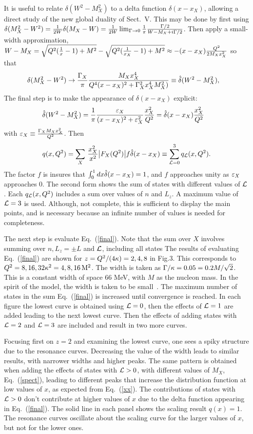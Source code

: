 \documentclass[aps,prd,amsmath,longbibliography]{revtex4-1}
\def\xX{x_X}
\newcommand{\eq}[1]{Eq.~(\ref{#1})}
\def\bea{\begin{eqnarray}}
\def\eea{\end{eqnarray}}\def\a{\alpha}\newcommand{\bfk}{{\bf k}}\newcommand{\bfq}{{\bf q}}
\begin{document}
{ It is useful to relate $\delta(W^2-M_X^2)$  to a delta function  $\delta(x-x_X)$, allowing a direct study of the new global duality of
 Sect.~V.  This may be done by first  using $ \delta(M_X^2 -W^2)= {1\over 2W}\delta(M_X-W)={1\over 2W} \lim_{\Gamma\to0}{1\over \pi}{\Gamma/2\over W-M_X+i\Gamma/2}$. Then apply a  small-width approximation, $W-M_X =\sqrt{Q^2({1\over x}-1)+M^2}-\sqrt{{Q^2({1\over x_X}-1)+M^2}}\approx- (x-\xX) {Q^2\over 2M_Xx_X^2} $ so that \bea&%
\d(M_X^2 -W^2)\to{\GX \over \pi } {M_Xx_X^4\over Q^4(x-\xX)^2+\GX^2x_X^4M_X^2)} \equiv \hat\d(W^2-M_X^2),
\label{final}\eea
The final step is to make the appearance of $\delta(x-x_X)$ explicit:
\bea  &\hat\d(W^2-M_X^2)= {1\over\pi}{\ve_X \over(x-x_X)^2+\ve_X^2} {x_X^2\over Q^2}
=\hat\d(x-x_X){x_X^2\over Q^2} \label{delta}\eea
with
$ \varepsilon_X\equiv {\Gamma_X M_X x_X^2\over Q^2}$.
Then \bea q(x,Q^2)=\sum_X\,{x_X^2\over x^2}\big|F_X(Q^2)\big|f\hat\d(x-x_X)\equiv \sum_{\cL=0}^3 q_\cL(x,Q^2).\label{final}\eea
The factor $f$ is insures that $\int_0^1 dx\hat{\delta}(x-x_X)=1$, and  $f$ approaches unity as $\varepsilon_X$ approaches 0. The second form shows the sum of states with different values of ${\cal L}$. Each $q_{\cal L}(x,Q^2)$ includes a sum over values of $n$ and $L_z$. A maximum value of ${\cal L}=3$ is used. Although, not complete, this is sufficient to display the main points, and is necessary because an infinite number of values is needed for completeness.

The next step is evaluate  \eq{final}. Note that the sum over $X$ involves summing over $n,L_z=\pm L$ and ${\cal L}$, including all states
The results of evaluating \eq{final}  are shown for $z=Q^2/(4\kappa)=2,4,8$ in Fig.3.  This corresponds to $Q^2 =8,16,32 \kappa^2=4,8,16 \,\rm M^2$. The width is taken as $\Gamma/\kappa=0.05=0.2M/\sqrt{2}$. This is a constant width of  space 66 MeV, with  $M$ as the nucleon mass.
In the spirit of the model, the width is taken to be small~\cite{Isgur:2001bt,Jeschonnek:2003sb}. The maximum  number of states in the sum \eq{final} is increased until convergence is reached. 
In each figure the lowest curve is obtained using ${\cal L}=0$, then the effects of ${\cal L}=1$ are added leading to the next lowest curve. Then the effects of adding states with ${\cal L}=2$ and ${\cal L}=3$ are included and result in two more curves. 

Focusing first on $z=2$ and examining  the lowest curve, one sees a spiky structure due to the resonance curves. Decreasing the value of the width leads to similar results, with narrower widths and higher peaks. The same pattern is obtained when
 adding the effects of states with ${\cal L}>0$, with different values of $M_X$, \eq{spect}, leading to different peaks that increase the distribution function at low values of $x$, as expected from \eq{xx}. %
The  contributions  of  states with ${\cal L}>0$ don't contribute  at higher values of $x$ due to the delta function appearing in \eq{final}.
The solid line in each panel shows the scaling result $q(x)=1$. The resonance curves oscillate about the scaling curve for the larger values of $x$, but not for the lower ones.   


}
\end{document}
